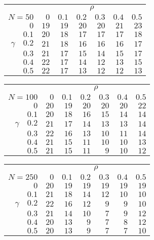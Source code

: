 \begin{tabular}{r|rrrrrr}
\hline\hline
 &\multicolumn{6}{c}{$\rho$} \\ 
 $N = 50$ & $0$ & $0.1$ & $0.2$ & $0.3$ & $0.4$ & $0.5$ \\ 
 \hline$0$ & $19$ & $19$ & $20$ & $20$ & $21$ & $23$\\ 
$0.1$ & $20$ & $18$ & $17$ & $17$ & $17$ & $18$\\ 
$\gamma\quad$$0.2$ & $21$ & $18$ & $16$ & $16$ & $16$ & $17$\\ 
$0.3$ & $21$ & $17$ & $15$ & $14$ & $15$ & $17$\\ 
$0.4$ & $22$ & $17$ & $14$ & $12$ & $13$ & $15$\\ 
$0.5$ & $22$ & $17$ & $13$ & $12$ & $12$ & $13$\\ 
 \hline 
 \end{tabular}
 
 \vspace{2em} 
 
\begin{tabular}{r|rrrrrr}
\hline\hline
 &\multicolumn{6}{c}{$\rho$} \\ 
 $N = 100$ & $0$ & $0.1$ & $0.2$ & $0.3$ & $0.4$ & $0.5$ \\ 
 \hline$0$ & $20$ & $19$ & $20$ & $20$ & $20$ & $22$\\ 
$0.1$ & $20$ & $18$ & $16$ & $15$ & $14$ & $14$\\ 
$\gamma\quad$$0.2$ & $21$ & $17$ & $14$ & $13$ & $13$ & $14$\\ 
$0.3$ & $22$ & $16$ & $13$ & $10$ & $11$ & $14$\\ 
$0.4$ & $21$ & $15$ & $11$ & $10$ & $10$ & $13$\\ 
$0.5$ & $21$ & $15$ & $11$ & $9$ & $10$ & $12$\\ 
 \hline 
 \end{tabular}
 
 \vspace{2em} 
 
\begin{tabular}{r|rrrrrr}
\hline\hline
 &\multicolumn{6}{c}{$\rho$} \\ 
 $N = 250$ & $0$ & $0.1$ & $0.2$ & $0.3$ & $0.4$ & $0.5$ \\ 
 \hline$0$ & $20$ & $19$ & $19$ & $19$ & $19$ & $19$\\ 
$0.1$ & $21$ & $18$ & $14$ & $12$ & $10$ & $10$\\ 
$\gamma\quad$$0.2$ & $22$ & $16$ & $12$ & $9$ & $9$ & $10$\\ 
$0.3$ & $21$ & $14$ & $10$ & $7$ & $9$ & $12$\\ 
$0.4$ & $20$ & $13$ & $9$ & $7$ & $8$ & $12$\\ 
$0.5$ & $20$ & $13$ & $9$ & $7$ & $7$ & $10$\\ 
 \hline 
 \end{tabular}
